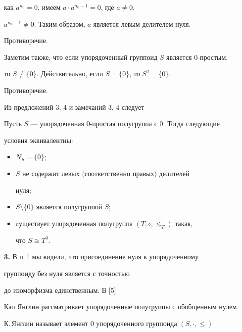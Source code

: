 как $a^{n_0}=0$, имеем $a\cdot a^{n_0-1}=0$, где $a\ne0$, 


$a^{n_0-1}\ne0$. Таким образом, $a$ является левым делителем нуля. 


Противоречие. 


 


Заметим также, что если упорядоченный группоид $S$ является 0-простым, 


то $S\ne\{0\}$. Действительно, если $S=\{0\}$, то $S^2=\{0\}$. 


Противоречие. 


 


Из предложений 3, 4 и замечаний 3, 4 следует


 


\begin{thmnonum} 


Пусть $S$ --- упорядоченная $0$-простая полугруппа с $0$. Тогда следующие 


условия эквивалентны\/${:}$ 


\begin{itemize} 


\item[1)] $N_S=\{0\};$ 


\item[2)] $S$ не содержит левых $($соответственно правых$)$ делителей 


нуля\/$;$


\item[3)] $S\setminus\{0\}$ является полугруппой $S;$ 


\item[4)] cуществует упорядоченная полугруппа $(T,\circ,\le_T)$ такая, 


что $S\cong T^0$. 


\end{itemize} 


\end{thmnonum} 


 


{\bf 3.} В п.\,1 мы видели, что присоединение нуля к упорядоченному 


группоиду без нуля является с точностью 


до изоморфизма единственным. В [5] 


Као Янглин рассматривает упорядоченные полугруппы с обобщенным нулем. 


К.\,Янглин называет элемент 0 упорядоченного группоида $(S,\cdot,\le)$ 


